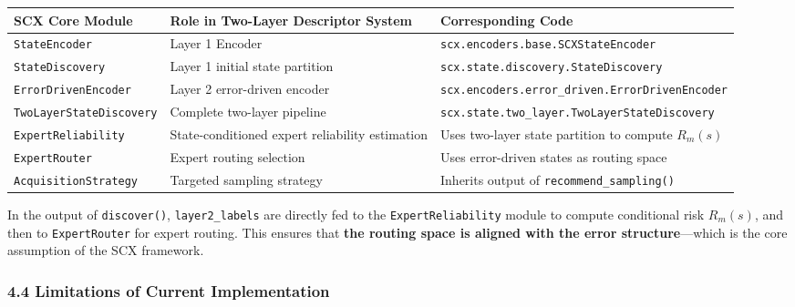 \documentclass[
  12pt,
]{article}
\begin{document}
\begin{longtable}[]{@{}
  >{\raggedright\arraybackslash}p{}
  >{\raggedright\arraybackslash}p{}
  >{\raggedright\arraybackslash}p{}@{}}
\toprule\noalign{}
\begin{minipage}[b]{\linewidth}\raggedright
SCX Core Module
\end{minipage} & \begin{minipage}[b]{\linewidth}\raggedright
Role in Two-Layer Descriptor System
\end{minipage} & \begin{minipage}[b]{\linewidth}\raggedright
Corresponding Code
\end{minipage} \\
\midrule\noalign{}
\endhead
\bottomrule\noalign{}
\endlastfoot
\texttt{StateEncoder} & Layer 1 Encoder & \texttt{scx.encoders.base.SCXStateEncoder} \\
\texttt{StateDiscovery} & Layer 1 initial state partition & \texttt{scx.state.discovery.StateDiscovery} \\
\texttt{ErrorDrivenEncoder} & Layer 2 error-driven encoder & \texttt{scx.encoders.error\_driven.ErrorDrivenEncoder} \\
\texttt{TwoLayerStateDiscovery} & Complete two-layer pipeline & \texttt{scx.state.two\_layer.TwoLayerStateDiscovery} \\
\texttt{ExpertReliability} & State-conditioned expert reliability estimation & Uses two-layer state partition to compute $R_m(s)$ \\
\texttt{ExpertRouter} & Expert routing selection & Uses error-driven states as routing space \\
\texttt{AcquisitionStrategy} & Targeted sampling strategy & Inherits output of \texttt{recommend\_sampling()} \\
\end{longtable}

In the output of \texttt{discover()}, \texttt{layer2\_labels} are directly fed to the \texttt{ExpertReliability} module to compute conditional risk $R_m(s)$, and then to \texttt{ExpertRouter} for expert routing. This ensures that \textbf{the routing space is aligned with the error structure}---which is the core assumption of the SCX framework.

\subsubsection{4.4 Limitations of Current Implementation}\label{limitations}
\end{document}

